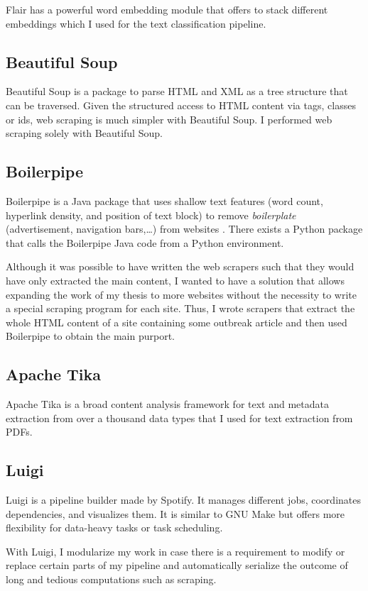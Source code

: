   Flair has a powerful word embedding module that offers to stack different embeddings which I used for the text classification pipeline.

\subsection{Beautiful Soup}
  Beautiful Soup is a package to parse HTML and XML as a tree structure that can be traversed.
  Given the structured access to HTML content via tags, classes or ids, web scraping is much simpler with Beautiful Soup.
  I performed web scraping solely with Beautiful Soup.

\subsection{Boilerpipe}
  Boilerpipe is a Java package that uses shallow text features (word count, hyperlink density, and position of text block) to remove \emph{boilerplate} (advertisement, navigation bars,\dots) from websites \citep{Kohlschutter2010}.
  There exists a Python package that calls the Boilerpipe Java code from a Python environment.

  Although it was possible to have written the web scrapers such that they would have only extracted the main content, I wanted to have a solution that allows expanding the work of my thesis to more websites without the necessity to write a special scraping program for each site.
  Thus, I wrote scrapers that extract the whole HTML content of a site containing some outbreak article and then used Boilerpipe to obtain the main purport.

\subsection{Apache Tika}\label{Tika}
  Apache Tika is a broad content analysis framework for text and metadata extraction from over a thousand data types that I used for text extraction from PDFs.

\subsection{Luigi}
  Luigi is a pipeline builder made by Spotify.
  It manages different jobs, coordinates dependencies, and visualizes them.
  It is similar to GNU Make but offers more flexibility for data-heavy tasks or task scheduling.

  With Luigi, I modularize my work in case there is a requirement to modify or replace certain parts of my pipeline and automatically serialize the outcome of long and tedious computations such as scraping.

